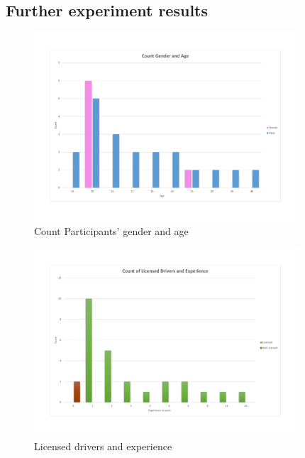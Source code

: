 \chapter{}

\section{Further experiment results}

\begin{figure}[!htb]
	\centering
	\includegraphics[height=7cm]{charts/genderAge.pdf}
	\caption[Age and gender of particpants]{Count Participants' gender and age }
	\label{fig:chart-genderage}
\end{figure}

\begin{figure}[!htb]
	\centering
	\includegraphics[height=7cm]{charts/licenseddriversexperience.pdf}
	\caption[Licensed drivers experience]{Licensed drivers and experience}
	\label{fig:chart-licenseddriversexperience}
\end{figure}


